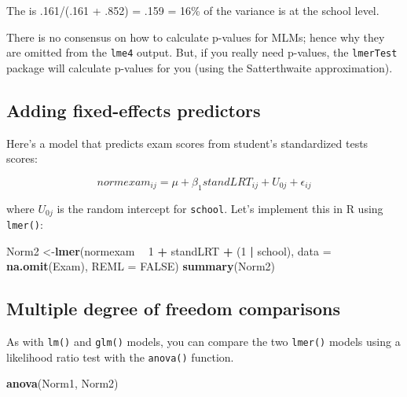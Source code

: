 \documentclass[
]{book}
\newenvironment{Shaded}{\begin{snugshade}}{\end{snugshade}}
\newcommand{\DataTypeTok}[1]{\textcolor[rgb]{0.13,0.29,0.53}{#1}}
\newcommand{\DecValTok}[1]{\textcolor[rgb]{0.00,0.00,0.81}{#1}}
\newcommand{\KeywordTok}[1]{\textcolor[rgb]{0.13,0.29,0.53}{\textbf{#1}}}
\newcommand{\NormalTok}[1]{#1}
\newcommand{\OperatorTok}[1]{\textcolor[rgb]{0.81,0.36,0.00}{\textbf{#1}}}
\newcommand{\OtherTok}[1]{\textcolor[rgb]{0.56,0.35,0.01}{#1}}
\newcommand{\StringTok}[1]{\textcolor[rgb]{0.31,0.60,0.02}{#1}}
\begin{document}
The is .161/(.161 + .852) = .159 = 16\% of the variance is at the school level.

There is no consensus on how to calculate p-values for MLMs; hence why they are omitted from the \texttt{lme4} output.
But, if you really need p-values, the \texttt{lmerTest} package will calculate p-values for you (using the Satterthwaite
approximation).

\hypertarget{adding-fixed-effects-predictors}{%
\subsection{Adding fixed-effects predictors}\label{adding-fixed-effects-predictors}}

Here's a model that predicts exam scores from student's standardized tests scores:

\[
normexam_{ij} = \mu + \beta_1standLRT_{ij} + U_{0j} + \epsilon_{ij}
\]

where \(U_{0j}\) is the random intercept for \texttt{school}. Let's implement this in R using \texttt{lmer()}:

\begin{Shaded}
\begin{Highlighting}[]
\NormalTok{  Norm2 <-}\KeywordTok{lmer}\NormalTok{(normexam }\OperatorTok{~}\StringTok{ }\DecValTok{1} \OperatorTok{+}\StringTok{ }\NormalTok{standLRT }\OperatorTok{+}\StringTok{ }\NormalTok{(}\DecValTok{1} \OperatorTok{|}\StringTok{ }\NormalTok{school),}
               \DataTypeTok{data =} \KeywordTok{na.omit}\NormalTok{(Exam), }\DataTypeTok{REML =} \OtherTok{FALSE}\NormalTok{) }
  \KeywordTok{summary}\NormalTok{(Norm2) }
\end{Highlighting}
\end{Shaded}

\hypertarget{multiple-degree-of-freedom-comparisons}{%
\subsection{Multiple degree of freedom comparisons}\label{multiple-degree-of-freedom-comparisons}}

As with \texttt{lm()} and \texttt{glm()} models, you can compare the two \texttt{lmer()} models using a likelihood ratio test with the \texttt{anova()} function.

\begin{Shaded}
\begin{Highlighting}[]
  \KeywordTok{anova}\NormalTok{(Norm1, Norm2)}
\end{Highlighting}
\end{Shaded}
\end{document}

